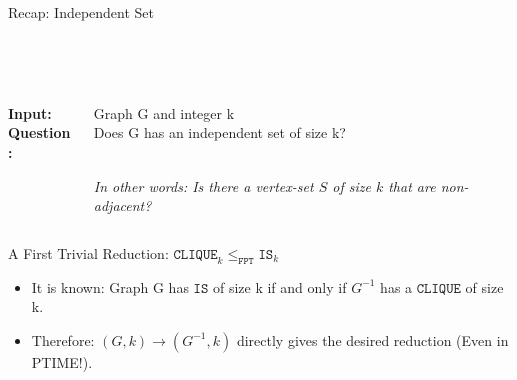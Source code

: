 \begin{frame}[c]{Recap: Independent Set}
\begin{center}
\begin{tcolorbox}[colback=green!5,colframe=green!40!black,title=$\mathtt{INDEPENDENT~SET}$ (See \cite{Cygan2015})]
\begin{columns}[T] %
    \begin{column}{.18\textwidth}
    \\~
    
    \textbf{Input:}\\
    \textbf{Question:}
    \end{column}
    \begin{column}{.78\textwidth}
    \\~
    
    Graph G and integer k\\
    Does G has an independent set of size k?
    \\~
    
   \textit{In other words: Is there a vertex-set $S$ of size $k$  that are non-adjacent?}
    \end{column}
 \end{columns}
\end{tcolorbox}

\end{center}
\end{frame}

\begin{frame}[c]{A First Trivial Reduction: $\mathtt{CLIQUE}_k \leq_{\mathtt{FPT}} \mathtt{IS}_k$}
\begin{center}

\begin{itemize}
    \pause\item It is known: Graph G has $\mathtt{IS}$ of size k if and only if $G^{-1}$ has a $\mathtt{CLIQUE}$ of size k.
    \pause\item Therefore: $(G, k) \longrightarrow (G^{-1}, k)$ directly gives the desired reduction (Even in PTIME!).
\end{itemize}
\end{center}
\end{frame}

